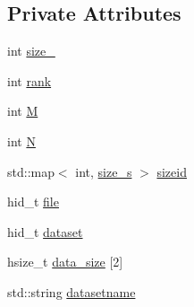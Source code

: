 \subsection*{\-Private \-Attributes}
\begin{DoxyCompactItemize}
\item 
int \hyperlink{classHDF_a4b0ee3e98c89b373052525bb5abd8fae}{size\-\_\-}
\item 
int \hyperlink{classHDF_ad8673b6d5dacddd59fcb8c10682160f7}{rank}
\item 
int \hyperlink{classHDF_aee1593ceda7b33a941e52e9f6e998f51}{\-M}
\item 
int \hyperlink{classHDF_ab3b5c9aa5d584ac3aa16ee9c6d04c340}{\-N}
\item 
std\-::map$<$ int, \hyperlink{structHDF_1_1size__s}{size\-\_\-s} $>$ \hyperlink{classHDF_ab47d2b1f7a374429d26ec54f15f4cea5}{sizeid}
\item 
hid\-\_\-t \hyperlink{classHDF_ab7e91e3f89c7fb189e0b0d9705d2f569}{file}
\item 
hid\-\_\-t \hyperlink{classHDF_adc37f93332228a0d29d1d0b8f7021b0c}{dataset}
\item 
hsize\-\_\-t \hyperlink{classHDF_a5fcc08146bef981eb0c865e01f8578a3}{data\-\_\-size} \mbox{[}2\mbox{]}
\item 
std\-::string \hyperlink{classHDF_a9b95020b5a2be0e7d2930c1221df9aa4}{datasetname}
\end{DoxyCompactItemize}


